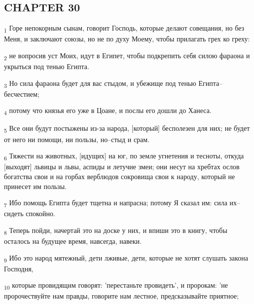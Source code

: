 \subsection{CHAPTER 30}
\begin{tcolorbox}
\textsubscript{1} Горе непокорным сынам, говорит Господь, которые делают совещания, но без Меня, и заключают союзы, но не по духу Моему, чтобы прилагать грех ко греху:
\end{tcolorbox}
\begin{tcolorbox}
\textsubscript{2} не вопросив уст Моих, идут в Египет, чтобы подкрепить себя силою фараона и укрыться под тенью Египта.
\end{tcolorbox}
\begin{tcolorbox}
\textsubscript{3} Но сила фараона будет для вас стыдом, и убежище под тенью Египта--бесчестием;
\end{tcolorbox}
\begin{tcolorbox}
\textsubscript{4} потому что князья его уже в Цоане, и послы его дошли до Ханеса.
\end{tcolorbox}
\begin{tcolorbox}
\textsubscript{5} Все они будут постыжены из-за народа, [который] бесполезен для них; не будет от него ни помощи, ни пользы, но--стыд и срам.
\end{tcolorbox}
\begin{tcolorbox}
\textsubscript{6} Тяжести на животных, [идущих] на юг, по земле угнетения и тесноты, откуда [выходят] львицы и львы, аспиды и летучие змеи; они несут на хребтах ослов богатства свои и на горбах верблюдов сокровища свои к народу, который не принесет им пользы.
\end{tcolorbox}
\begin{tcolorbox}
\textsubscript{7} Ибо помощь Египта будет тщетна и напрасна; потому Я сказал им: сила их--сидеть спокойно.
\end{tcolorbox}
\begin{tcolorbox}
\textsubscript{8} Теперь пойди, начертай это на доске у них, и впиши это в книгу, чтобы осталось на будущее время, навсегда, навеки.
\end{tcolorbox}
\begin{tcolorbox}
\textsubscript{9} Ибо это народ мятежный, дети лживые, дети, которые не хотят слушать закона Господня,
\end{tcolorbox}
\begin{tcolorbox}
\textsubscript{10} которые провидящим говорят: 'перестаньте провидеть', и пророкам: 'не пророчествуйте нам правды, говорите нам лестное, предсказывайте приятное;
\end{tcolorbox}
